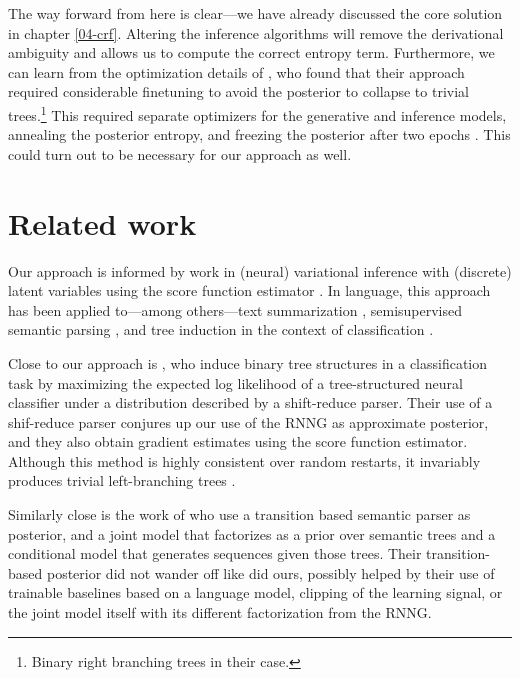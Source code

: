     The way forward from here is clear---we have already discussed the core solution in chapter \ref{04-crf}. Altering the inference algorithms will remove the derivational ambiguity and allows us to compute the correct entropy term. Furthermore, we can learn from the optimization details of \citet{kim2019unsupervised}, who found that their approach required considerable finetuning to avoid the posterior to collapse to trivial trees.\footnote{Binary right branching trees in their case.} This required separate optimizers for the generative and inference models, annealing the posterior entropy, and freezing the posterior after two epochs \citep{kim2019unsupervised}. This could turn out to be necessary for our approach as well.

\section{Related work}
  Our approach is informed by work in (neural) variational inference with (discrete) latent variables using the score function estimator \citep{paisley2012viss,mnih2014nvil,ranganath2014black,mnih2016variational}. In language, this approach has been applied to---among others---text summarization \citep{miao2016discrete}, semisupervised semantic parsing \citep{yin2018structvae}, and tree induction in the context of classification \citep{yogatama2016reinforcement}.

  Close to our approach is \citet{yogatama2016reinforcement}, who induce binary tree structures in a classification task by maximizing the expected log likelihood of a tree-structured neural classifier under a distribution described by a shift-reduce parser. Their use of a shif-reduce parser conjures up our use of the RNNG as approximate posterior, and they also obtain gradient estimates using the score function estimator. Although this method is highly consistent over random restarts, it invariably produces trivial left-branching trees \citep{williams2018latent}.

  Similarly close is the work of \cite{yin2018structvae} who use a transition based semantic parser as posterior, and a joint model that factorizes as a prior over semantic trees and a conditional model that generates sequences given those trees. Their transition-based posterior did not wander off like did ours, possibly helped by their use of trainable baselines based on a language model, clipping of the learning signal, or the joint model itself with its different factorization from the RNNG.

